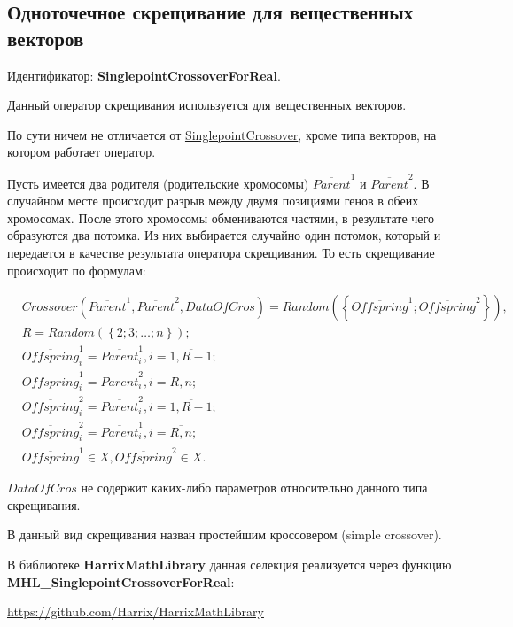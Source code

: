 \subsection{Одноточечное скрещивание для вещественных векторов}\label{SetOfOperatorsAlgorithms:SinglepointCrossoverForReal}

Идентификатор: \textbf{SinglepointCrossoverForReal}.

Данный оператор скрещивания используется для вещественных векторов.

По сути ничем не отличается от \hyperref[SetOfOperatorsAlgorithms:SinglepointCrossover]{SinglepointCrossover}, кроме типа векторов, на котором работает оператор.

Пусть имеется два родителя (родительские хромосомы) $ \overline{Parent}^1 $ и $ \overline{Parent}^2$. В случайном месте происходит разрыв между двумя позициями генов в обеих хромосомах. После этого хромосомы обмениваются частями, в результате чего образуются два потомка. Из них выбирается случайно один потомок, который и передается в качестве результата оператора скрещивания. То есть скрещивание происходит по формулам:

\begin{align}
\label{SetOfOperatorsAlgorithms:eq:SinglepointCrossoverForReal}
&Crossover \left( \overline{Parent}^1, \overline{Parent}^2, DataOfCros\right)=Random \left(\left\lbrace \overline{Offspring}^1; \overline{Offspring}^2\right\rbrace  \right), \\
&R=Random\left( \left\lbrace 2; 3; \ldots; n\right\rbrace \right); \nonumber \\
& \overline{Offspring}^1_i=\overline{Parent}^1_i, i=\overline{1,R-1};\nonumber\\
&  \overline{Offspring}^1_i=\overline{Parent}^2_i, i=\overline{R,n};\nonumber\\
&\overline{Offspring}^2_i=\overline{Parent}^2_i, i=\overline{1,R-1};\nonumber\\
& \overline{Offspring}^2_i=\overline{Parent}^1_i, i=\overline{R,n};\nonumber\\
&\overline{Offspring}^1\in X, \overline{Offspring}^2\in X.\nonumber
\end{align}

$ DataOfCros $ не содержит каких-либо параметров относительно данного типа скрещивания.

В \cite{web:basegroup.ru:real_coded_ga} данный вид скрещивания назван простейшим кроссовером (simple crossover).

В библиотеке \textbf{HarrixMathLibrary} данная селекция реализуется через функцию \textbf{MHL\_SinglepointCrossoverForReal}:

\href{https://github.com/Harrix/HarrixMathLibrary}{https://github.com/Harrix/HarrixMathLibrary}